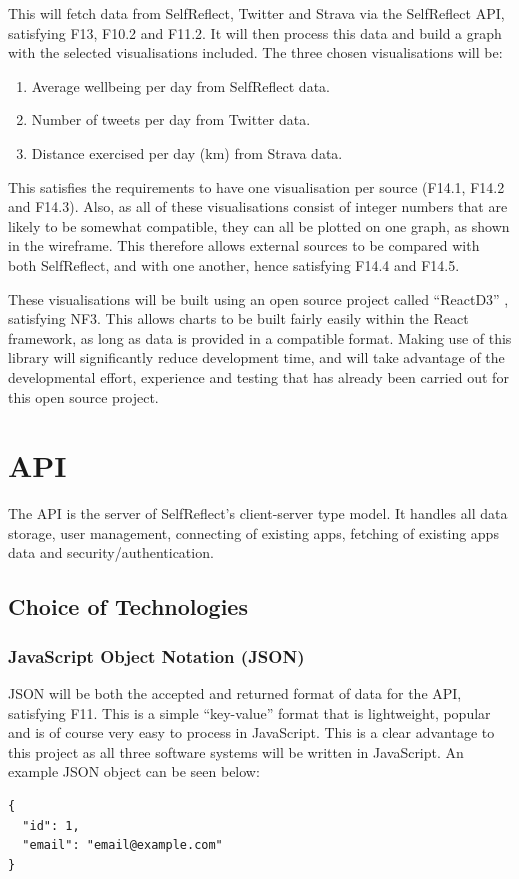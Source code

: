 \documentclass[11pt,openright,a4paper]{report}
\begin{document}
\newpage
This will fetch data from SelfReflect, Twitter and Strava via the SelfReflect API, satisfying F13, F10.2 and F11.2. It will then process this data and build a graph with the selected visualisations included. The three chosen visualisations will be:
\begin{enumerate}
\item Average wellbeing per day from SelfReflect data.
\item Number of tweets per day from Twitter data.
\item Distance exercised per day (km) from Strava data.
\end{enumerate}

This satisfies the requirements to have one visualisation per source (F14.1, F14.2 and F14.3). Also, as all of these visualisations consist of integer numbers that are likely to be somewhat compatible, they can all be plotted on one graph, as shown in the wireframe. This therefore allows external sources to be compared with both SelfReflect, and with one another, hence satisfying F14.4 and F14.5.

These visualisations will be built using an open source project called \enquote{ReactD3} \parencite{reactd3}, satisfying NF3. This allows charts to be built fairly easily within the React framework, as long as data is provided in a compatible format. Making use of this library will significantly reduce development time, and will take advantage of the developmental effort, experience and testing that has already been carried out for this open source project.

\section{API} \label{sec:apidesign}
The API is the server of SelfReflect's client-server type model. It handles all data storage, user management, connecting of existing apps, fetching of existing apps data and security/authentication.

\subsection{Choice of Technologies}
\subsubsection{JavaScript Object Notation (JSON)}
JSON will be both the accepted and returned format of data for the API, satisfying F11. This is a simple \enquote{key-value} format that is lightweight, popular and is of course very easy to process in JavaScript. This is a clear advantage to this project as all three software systems will be written in JavaScript. An example JSON object can be seen below:
\begin{lstlisting}
{
  "id": 1,
  "email": "email@example.com"
}
\end{lstlisting}
\end{document}
